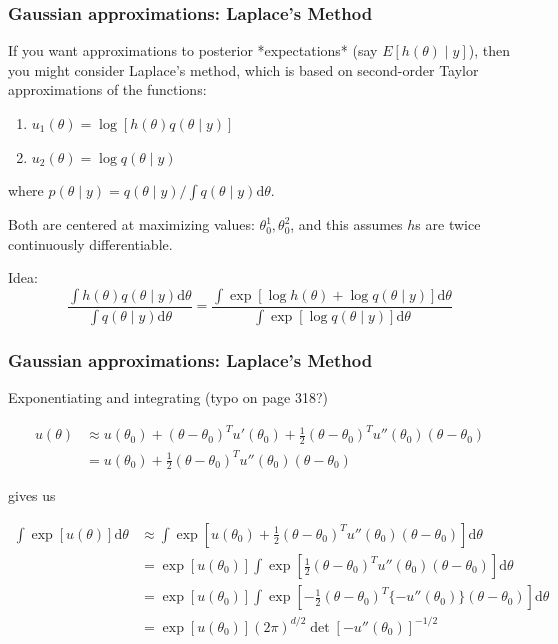\documentclass{beamer}
\begin{document}
\begin{frame}[fragile]
\frametitle{Gaussian approximations: Laplace's Method}

If you want approximations to posterior *expectations* (say $E[h(\theta) \mid y]$), then you might consider Laplace's method, which is based on second-order Taylor approximations of the functions:
\begin{enumerate}
\item $u_1(\theta) = \log[h(\theta)q(\theta \mid y)]$
\item $u_2(\theta) = \log q(\theta \mid y)$
\end{enumerate}
where $p(\theta \mid y) = q(\theta \mid y) / \int q(\theta \mid y)\text{d}\theta$. 
\newline

Both are centered at maximizing values: $\theta_0^1, \theta_0^2$, and this assumes $h$s are twice continuously differentiable.
\newline

Idea:
$$
\frac{\int h(\theta)q(\theta \mid y) \text{d}\theta}{\int q(\theta \mid y) \text{d}\theta } = \frac{\int \exp\left[ \log h(\theta) + \log q(\theta \mid y) \right] \text{d}\theta}{ \int \exp\left[ \log q(\theta \mid y) \right] \text{d}\theta }
$$


\end{frame}


\begin{frame}[fragile]
\frametitle{Gaussian approximations: Laplace's Method}

Exponentiating and integrating (typo on page 318?)

\begin{align*}
u(\theta) &\approx u(\theta_0) + (\theta - \theta_0)^Tu'(\theta_0) + \frac{1}{2}(\theta - \theta_0)^T u''(\theta_0)(\theta - \theta_0) \\
&= u(\theta_0) + \frac{1}{2}(\theta - \theta_0)^T u''(\theta_0)(\theta - \theta_0)
\end{align*}

gives us

\begin{align*}
\int \exp[ u(\theta) ] \text{d}\theta &\approx \int \exp[ u(\theta_0)  + \frac{1}{2}(\theta - \theta_0)^T u''(\theta_0)(\theta - \theta_0) ] \text{d}\theta \\
&= \exp [u(\theta_0)] \int \exp\left[\frac{1}{2}(\theta - \theta_0)^T u''(\theta_0)(\theta - \theta_0) \right] \text{d}\theta \\
&= \exp [u(\theta_0)] \int \exp\left[-\frac{1}{2}(\theta - \theta_0)^T \{-u''(\theta_0)\}(\theta - \theta_0) \right] \text{d}\theta \\
&= \exp [u(\theta_0)] (2\pi)^{d/2} \det[-u''(\theta_0)]^{-1/2}
\end{align*}


\end{frame}
\end{document}
